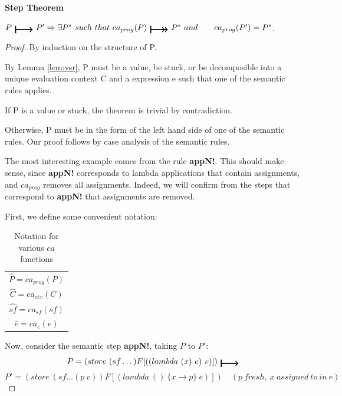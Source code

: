 \begin{theorem}\label{thm:step} \textbf{Step Theorem}


$P\ \step\ P' =>\\ \exists {P^{*}}\ such\ that\\ \ ca_{prog}(P)\ \trstep\ {P^{*}}\ and\\ \qquad ca_{prog}(P') = {P^{*}}$.

\end{theorem}
\begin{proof} By induction on the structure of P.

By Lemma \ref{lem:vsr}, P must be a value, be stuck, or be decomposible into a unique evaluation context C and a  expression e such that one of the semantic rules applies.

If P is a value or stuck, the theorem is trivial by contradiction.

Otherwise, P must be in the form of the left hand side of one of the semantic rules. Our proof follows by case analysis of the semantic rules.

The most interesting example comes from the rule \textbf{appN!}. This should make sense, since \textbf{appN!} corresponds to lambda applications that contain assignments, and $ca_{prog}$ removes all assignments. Indeed, we will confirm from the steps that correspond to \textbf{appN!} that assignments are removed.

First, we define some convenient notation:
\begin{table}[h]
    \centering
    \begin{tabular}{c}
         $\hat{P} = ca_{prog}(P)$  \\
         
        $\hat{C} = ca_{ctx}(C)$     \\

        $\hat{sf} = ca_{sf}(sf)$    \\

        $\hat{e} = ca_e(e)$     \\
    \end{tabular}
    \caption{Notation for various $ca$ functions}
    \label{tab:ca_notation}
\end{table}

Now, consider the semantic step \textbf{appN!}, taking $P$ to $P'$: 
\[
P = (store\ (sf \dots) F[((lambda\ (x)\ e)\ v)])\ \step 
\]
\[
P' = (store\ (sf \dots (p\ v)) F[(lambda\ ()\ \{x \xrightarrow{} p\}\ e)]) \quad (p\ fresh,\ x\ assigned\ to\ in\ e)
\]


\end{proof}
